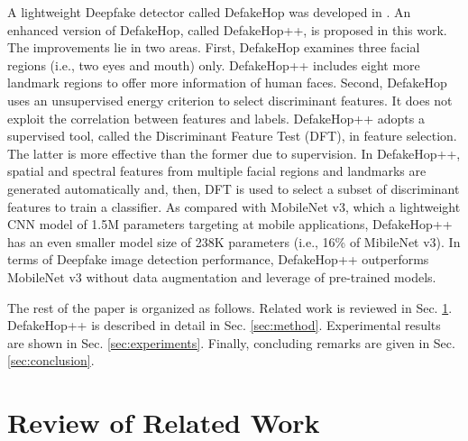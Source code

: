 \documentclass[main, biber]{now-journal}
\begin{document}
A lightweight Deepfake detector called DefakeHop was developed in
\citep{chen2021defakehop}. An enhanced version of DefakeHop, called
DefakeHop++, is proposed in this work.  The improvements lie in two
areas.  First, DefakeHop examines three facial regions (i.e., two eyes
and mouth) only.  DefakeHop++ includes eight more landmark regions to
offer more information of human faces. Second, DefakeHop uses an
unsupervised energy criterion to select discriminant features.  It does
not exploit the correlation between features and labels.  DefakeHop++
adopts a supervised tool, called the Discriminant Feature Test (DFT), in
feature selection. The latter is more effective than the former due to
supervision. In DefakeHop++, spatial and spectral features from multiple
facial regions and landmarks are generated automatically and, then, DFT
is used to select a subset of discriminant features to train a
classifier. As compared with MobileNet v3, which a lightweight CNN model
of 1.5M parameters targeting at mobile applications, DefakeHop++ has an
even smaller model size of 238K parameters (i.e., 16\% of MibileNet v3).
In terms of Deepfake image detection performance, DefakeHop++
outperforms MobileNet v3 without data augmentation and leverage of
pre-trained models. 

The rest of the paper is organized as follows. Related work is reviewed
in Sec. \ref{sec:review}. DefakeHop++ is described in detail in Sec.
\ref{sec:method}. Experimental results are shown in Sec.
\ref{sec:experiments}.  Finally, concluding remarks are given in Sec.
\ref{sec:conclusion}. 

\section{Review of Related Work}\label{sec:review}
\end{document}
